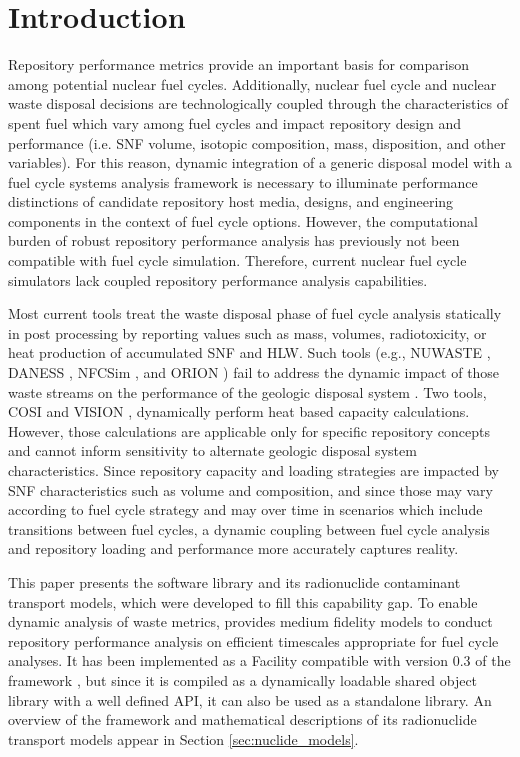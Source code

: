 \section{Introduction}\label{sec:introduction}
Repository performance metrics provide an important basis for comparison among
potential nuclear fuel cycles.
Additionally, nuclear fuel cycle and nuclear waste disposal decisions are
technologically coupled through the characteristics of spent fuel which vary among fuel cycles and impact repository design and performance (i.e. \gls{SNF} volume, isotopic composition, mass, disposition, and other variables). 
For this reason, dynamic integration of a generic disposal model with a fuel 
cycle systems analysis framework is necessary to illuminate performance 
distinctions of candidate repository host media, designs, and engineering 
components in the context of fuel cycle options. 
However, the computational
burden of robust repository performance analysis has previously not been
compatible with fuel cycle simulation.
Therefore, current nuclear fuel cycle simulators
lack coupled repository performance analysis capabilities.

Most current tools treat the waste disposal
phase of fuel cycle analysis statically in post processing by reporting
values such as mass, volumes, radiotoxicity, or heat production of accumulated
\gls{SNF} and \gls{HLW}. Such tools
(e.g.,
\gls{NUWASTE} \cite{abkowitz_nuclear_2011},
\gls{DANESS} \cite{van_den_durpel_daness:_2006},
\gls{NFCSim} \cite{schneider_nfcsim_2004}, and
ORION \cite{gregg_orion_2011})
fail to address the dynamic impact of those waste streams on the performance of the
geologic disposal system \cite{wilson_comparing_2011}.  Two tools, \gls{COSI}
\cite{boucher_international_2010} and \gls{VISION} \cite{yacout_vision_2006,
wilson_comparing_2011, radel_repository_2007, boucher_international_2010},
dynamically perform heat based capacity calculations. 
However, those calculations are applicable only for specific
repository concepts and cannot inform sensitivity to alternate geologic disposal
system characteristics.
Since repository capacity and loading strategies are impacted by \gls{SNF} 
characteristics such as volume and composition, and since those may vary 
according to fuel cycle strategy and may over time in scenarios which 
include transitions between fuel cycles, a dynamic coupling between fuel cycle 
analysis and repository loading and performance more accurately captures reality.

This paper presents the \Cyder software library \cite{huff_cyder_2013} and its radionuclide
contaminant transport models, which were  developed to fill this capability gap.  To
enable dynamic analysis of waste metrics, \Cyder provides medium fidelity
models to conduct repository performance analysis on efficient timescales
appropriate for fuel cycle analyses. It has been implemented as a Facility
compatible with version 0.3 of the \Cyclus framework
\cite{wilson_cyclus:_2012}, but since it is compiled as a dynamically loadable 
shared object library with a well defined \gls{API}, it can also be used as a standalone library. An
overview of the \Cyder framework and mathematical descriptions of its
radionuclide transport models appear in Section \ref{sec:nuclide_models}.

